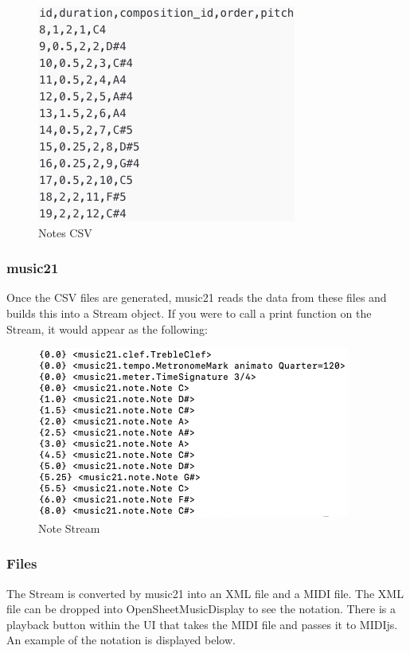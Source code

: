 \begin{figure}[!htbp]
	\centering
	\caption{Notes CSV}
	\includegraphics[scale=0.7]{images/notesCSV.png}
\end{figure}

\subsubsection{music21}
\label{subsubsec:outputmusic21}

Once the CSV files are generated, music21 reads the data from these files and builds this into a Stream object.  If you were to call a print function on the Stream, it would appear as the following:

\begin{figure}[!htbp]
	\centering
	\caption{Note Stream}
	\includegraphics[scale=0.7]{images/noteStream.png}
\end{figure}

\subsubsection{Files}
\label{subsubsec:files}

The Stream is converted by music21 into an XML file and a MIDI file.  The XML file can be dropped into OpenSheetMusicDisplay to see the notation.  There is a playback button within the UI that takes the MIDI file and passes it to MIDIjs.  An example of the notation is displayed below.


